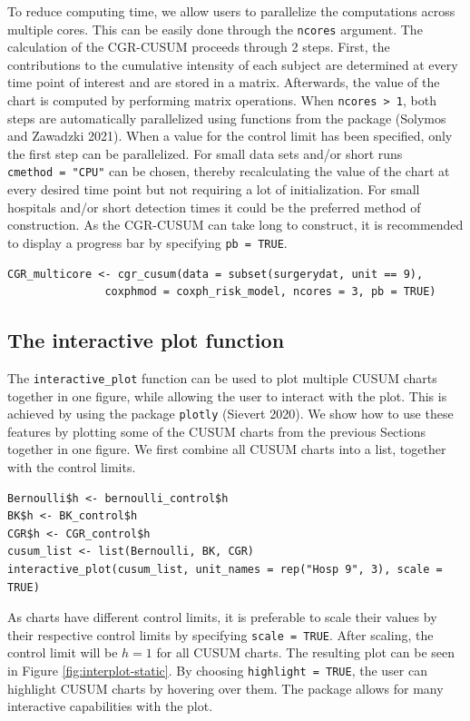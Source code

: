 To reduce computing time, we allow users to parallelize the computations across multiple cores. This can be easily done through the \texttt{ncores} argument. The calculation of the CGR-CUSUM proceeds through 2 steps. First, the contributions to the cumulative intensity of each subject are determined at every time point of interest and are stored in a matrix. Afterwards, the value of the chart is computed by performing matrix operations. When \texttt{ncores\ \textgreater{}\ 1}, both steps are automatically parallelized using functions from the  package (Solymos and Zawadzki 2021). When a value for the control limit has been specified, only the first step can be parallelized. For small data sets and/or short runs \texttt{cmethod\ =\ "CPU"} can be chosen, thereby recalculating the value of the chart at every desired time point but not requiring a lot of initialization. For small hospitals and/or short detection times it could be the preferred method of construction. As the CGR-CUSUM can take long to construct, it is recommended to display a progress bar by specifying \texttt{pb\ =\ TRUE}.

\begin{verbatim}
CGR_multicore <- cgr_cusum(data = subset(surgerydat, unit == 9), 
               coxphmod = coxph_risk_model, ncores = 3, pb = TRUE)
\end{verbatim}

\hypertarget{the-interactive-plot-function}{%
\subsection{The interactive plot function}\label{the-interactive-plot-function}}

The \texttt{interactive\_plot} function can be used to plot multiple CUSUM charts together in one figure, while allowing the user to interact with the plot. This is achieved by using the package \texttt{plotly} (Sievert 2020). We show how to use these features by plotting some of the CUSUM charts from the previous Sections together in one figure. We first combine all CUSUM charts into a list, together with the control limits.

\begin{verbatim}
Bernoulli$h <- bernoulli_control$h
BK$h <- BK_control$h
CGR$h <- CGR_control$h
cusum_list <- list(Bernoulli, BK, CGR)
interactive_plot(cusum_list, unit_names = rep("Hosp 9", 3), scale = TRUE)
\end{verbatim}

As charts have different control limits, it is preferable to scale their values by their respective control limits by specifying \texttt{scale\ =\ TRUE}. After scaling, the control limit will be \(h = 1\) for all CUSUM charts. The resulting plot can be seen in Figure \ref{fig:interplot-static}. By choosing \texttt{highlight\ =\ TRUE}, the user can highlight CUSUM charts by hovering over them. The  package allows for many interactive capabilities with the plot.

